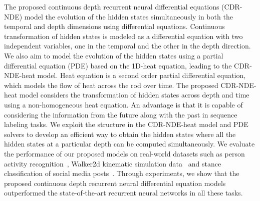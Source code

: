 \documentclass{article} %
\begin{document}
The proposed continuous depth recurrent neural  differential equations (CDR-NDE)  model the evolution of the hidden states simultaneously in both the temporal and depth dimensions using differential equations.  Continuous transformation of hidden states  is modeled as a differential equation with two independent variables, one in the temporal and the other in the depth direction.  We also aim to model the  evolution of the hidden states using a partial differential equation (PDE)  based on the 1D-heat equation, leading to the CDR-NDE-heat model. Heat equation is  a second order partial differential equation, which models the flow of heat across the rod over time. The proposed CDR-NDE-heat model considers the transformation of hidden states across depth and time using a non-homogeneous heat equation. An advantage is that it is capable of considering the information from the future along with the past in sequence labeling tasks.  We exploit the structure in the CDR-NDE-heat model and PDE solvers  to develop an efficient way to obtain the hidden states where  all the hidden states at a particular depth can be computed simultaneously.   We evaluate the performance of our proposed models  on real-world datasets such as person activity recognition~\citep{asuncion2007uci}, Walker2d kinematic simulation data~\citep{lechner2020learning}   and stance classification of social media posts~\citep{RumourEval_2019_dataset}. Through experiments, we show that the proposed continuous depth recurrent neural  differential equation models outperformed the state-of-the-art recurrent neural networks in all these tasks.   
\end{document}
